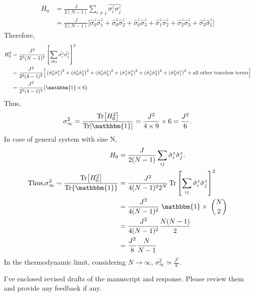 \documentclass[showpacs,floatfix,superscriptaddress, onecolumn, nofootinbib, 10pt]{revtex4-2}
\begin{document}
\begin{align}
H_0 &= \frac{J}{2(N-1)} \sum_{i \ne j} \hat{\sigma^z_i}\hat{\sigma^z_j}\nonumber\\
&= \frac{J}{2(N-1)} \Big[\hat{\sigma}^z_0 \hat{\sigma}^z_1 + \hat{\sigma}^z_0 \hat{\sigma}^z_2 + \hat{\sigma}^z_0 \hat{\sigma}^z_3 + \hat{\sigma}^z_1 \hat{\sigma}^z_2 + \hat{\sigma}^z_2 \hat{\sigma}^z_3 + \hat{\sigma}^z_3 \hat{\sigma}^z_1\Big]
\end{align}
Therefore,
\begin{align}
H_0^2 &= \frac{J^2}{2^2(N-1)^2} \left[\sum_{i \ne j} \hat{\sigma^z_i}\hat{\sigma^z_j}\right]^2\nonumber\\
&= \frac{J^2}{2^2(4-1)^2} \Big[\left(\hat{\sigma}^z_0 \hat{\sigma}^z_1\right)^2 + \left(\hat{\sigma}^z_0 \hat{\sigma}^z_2\right)^2  + \left(\hat{\sigma}^z_0 \hat{\sigma}^z_3\right)^2  + \left(\hat{\sigma}^z_1 \hat{\sigma}^z_2\right)^2  + \left(\hat{\sigma}^z_2 \hat{\sigma}^z_3\right)^2  + \left(\hat{\sigma}^z_3 \hat{\sigma}^z_1\right)^2  + \mbox{all other traceless terms}\Big]\nonumber\\
&= \frac{J^2}{2^2(4-1)^2} \big(\mathbbm{1} \times 6\big)
\end{align}
Thus, 
\begin{equation}
\sigma^2_\infty = \frac{\Tr[H_0^2]}{\Tr[\mathbbm{1}]} = \frac{J^2}{4 \times 9} \times 6 = \frac{J^2}{6} .
\end{equation}
In case of general system with size N,
\begin{align}
H_0 &= \frac{J}{2(N-1)} \sum_{ij} \hat{\sigma}^z_i \hat{\sigma}^z_j. \\
\mbox{Thus,}  \sigma^2_\infty \sim \frac{\Tr[H_0^2]}{\Tr{\mathbbm{1}}} &= \frac{J^2}{4(N-1)^2 2^N}\Tr\left[\sum_{ij} \hat{\sigma}^z_i \hat{\sigma}^z_j\right]^2\nonumber\\
&= \frac{J^2}{4(N-1)^2}\; \mathbbm{1} \times\; \binom{N}{2}\nonumber\\
&=\frac{J^2}{4(N-1)^2}\frac{N(N-1)}{2}\nonumber\\
&=\frac{J^2}{8}\frac{N}{N-1}
\end{align}
In the thermodynamic limit, considering $N\to\infty$, $\displaystyle \sigma^2_\infty \simeq \frac{J^2}{8}$.

\noindent I've enclosed revised drafts of the manuscript and response. Please review them and provide any feedback if any.
\end{document}
